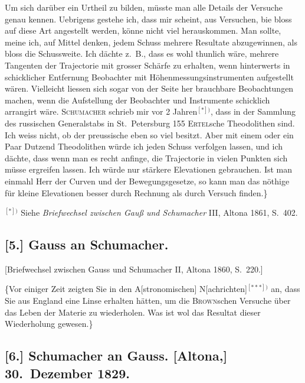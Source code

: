 \documentclass[12pt,a4paper]{article}
\begin{document}
Um sich dar\"uber ein Urtheil zu bilden, m\"usste man alle Details der Versuche genau kennen. Uebrigens gestehe ich, dass mir scheint, aus Versuchen, bie bloss auf diese Art angestellt werden, k\"onne nicht viel herauskommen. Man sollte, meine ich, auf Mittel denken, jedem Schuss mehrere Resultate abzugewinnen, als bloss die Schussweite. Ich d\"achte z.~B., dass es wohl thunlich w\"are, mehrere Tangenten der Trajectorie mit grosser Sch\"arfe zu erhalten, wenn hinterwerts in schicklicher Entfernung Beobachter mit H\"ohenmessungsinstrumenten aufgestellt w\"aren. Vielleicht liessen sich sogar von der Seite her brauchbare Beobachtungen machen, wenn die Aufstellung der Beobachter und Instrumente schicklich arrangirt w\"are. \textsc{Schumacher} schrieb mir vor 2 Jahren$^{[*])}$, dass in der Sammlung des russischen Generalstabs in St.~Petersburg 155 \textsc{Ertel}sche Theodolithen sind. Ich weiss nicht, ob der preussische eben so viel besitzt. Aber mit einem oder ein Paar Dutzend Theodolithen w\"urde ich jeden Schuss verfolgen lassen, und ich d\"achte, dass wenn man es recht anfinge, die Trajectorie in vielen Punkten sich m\"usse ergreifen lassen. Ich w\"urde nur st\"arkere Elevationen gebrauchen. Ist man einmahl Herr der Curven und der Bewegungsgesetze, so kann man das n\"othige f\"ur kleine Elevationen besser durch Rechnung als durch Versuch finden.\dotfill\}

\medskip\noindent
$^{[*])}$ Siehe \textit{Briefwechsel zwischen Gau\ss{} und Schumacher} III, Altona 1861, S.~402.

\subsection*{[5.] Gauss an Schumacher.}

[Briefwechsel zwischen Gauss und Schumacher II, Altona 1860, S.~220.]

\medskip\noindent
\{Vor einiger Zeit zeigten Sie in den A[stronomischen] N[achrichten]$^{[***])}$ an, dass Sie aus England eine Linse erhalten h\"atten, um die \textsc{Brown}schen Versuche \"uber das Leben der Materie zu wiederholen. Was ist wol das Resultat dieser Wiederholung gewesen.\dotfill\}

\subsection*{[6.] Schumacher an Gauss. [Altona,] 30.~Dezember 1829.}
\end{document}
